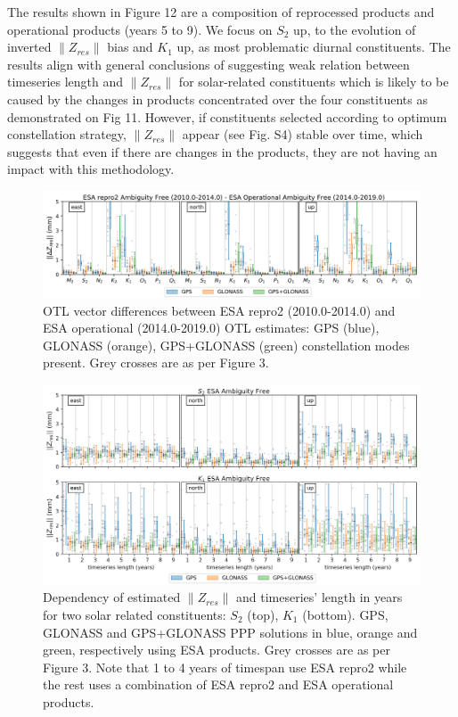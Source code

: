 \documentclass[se, manuscript]{copernicus}
\begin{document}
The results shown in Figure 12 are a composition of reprocessed products and operational products (years 5 to 9). We focus on $S_2$ up, to the evolution of inverted $\|Z_{res}\|$ bias and $K_1$ up, as most problematic diurnal constituents. The results align with general conclusions of \cite{Yuan2013} suggesting weak relation between timeseries length and $\|Z_{res}\|$ for solar-related constituents which is likely to be caused by the changes in products concentrated over the four constituents as demonstrated on Fig 11. However, if constituents selected according to optimum constellation strategy, $\|Z_{res}\|$ appear (see Fig. S4) stable over time, which suggests that even if there are changes in the products, they are not having an impact with this methodology.

\begin{figure}[t]
\includegraphics[width=17cm]{fig12.png}
\caption{OTL vector differences between ESA repro2 (2010.0-2014.0) and ESA operational (2014.0-2019.0) OTL estimates: GPS (blue), GLONASS (orange), GPS+GLONASS (green) constellation modes present. Grey crosses are as per Figure 3.}
\end{figure}



\begin{figure}[t]
\includegraphics[width=17cm]{fig11.png}
\caption{Dependency of estimated $\|Z_{res}\|$ and timeseries’ length in years for two solar related constituents: $S_2$ (top), $K_1$ (bottom). GPS, GLONASS and GPS+GLONASS PPP solutions in blue, orange and green, respectively using ESA products. Grey crosses are as per Figure 3. Note that 1 to 4 years of timespan use ESA repro2 while the rest uses a combination of ESA repro2 and ESA operational products.}
\end{figure}
\end{document}
